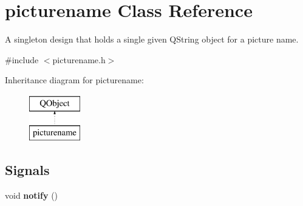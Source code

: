 \hypertarget{classpicturename}{}\section{picturename Class Reference}
\label{classpicturename}


A singleton design that holds a single given Q\+String object for a picture name.  




{\ttfamily \#include $<$picturename.\+h$>$}

Inheritance diagram for picturename\+:\begin{figure}[H]
\begin{center}
\leavevmode
\includegraphics[height=2.000000cm]{classpicturename}
\end{center}
\end{figure}
\subsection*{Signals}
\begin{DoxyCompactItemize}
\item 
\mbox{\label{classpicturename_a82cfb404225352e4148ebb462ad74762}} 
void {\bfseries notify} ()
\end{DoxyCompactItemize}
